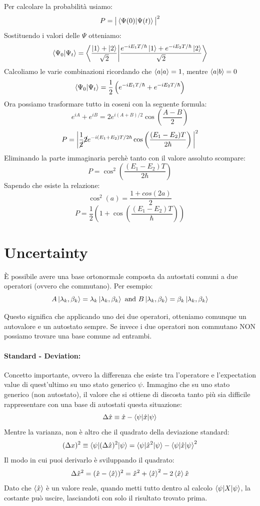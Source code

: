 \noindent Per calcolare la probabilità usiamo:
$$P = \big|\braket{\Psi(0)|\Psi(t)}\big|^2$$
Sostituendo i valori delle $\Psi$ otteniamo:
$$\braket{\Psi_0|\Psi_t} = \bigg\langle\frac{\ket{1} + \ket{2}}{\sqrt{2}}\bigg|\frac{e^{-iE_1T/\hbar}\ket{1} + e^{-iE_2T/\hbar}\ket{2}}{\sqrt{2}}\bigg\rangle$$
Calcoliamo le varie combinazioni ricordando che $\braket{a|a} = 1$, mentre $\braket{a|b} = 0$
$$\braket{\Psi_0|\Psi_t} = \frac{1}{2}\left( e^{-iE_1T/\hbar} + e^{-iE_2T/\hbar} \right)$$
Ora possiamo trasformare tutto in coseni con la seguente formula:
$$e^{iA} + e^{iB} = 2e^{i(A+B)/2} \cos\left(\frac{A-B}{2}\right)$$
$$P = \bigg|\frac{1}{\cancel{2}}\cancel{2}e^{-i(E_1+E_2)T/2\hbar}\cos\left( \frac{(E_1-E_2)T}{2\hbar}\right)\bigg|^2$$
Eliminando la parte immaginaria perchè tanto con il valore assoluto scompare:
$$P = \cos^2\left( \frac{(E_1-E_2)T}{2\hbar} \right)$$
Sapendo che esiste la relazione:
$$\cos^2(a) = \frac{1+cos(2a)}{2}$$
$$P = \frac{1}{2}\left(1 + \cos\left( \frac{(E_1 - E_2)T}{\hbar} \right)\right)$$

\section{Uncertainty}

È possibile avere una base ortonormale composta da autostati comuni a due operatori (ovvero che commutano). Per esempio:
$$A\ket{\lambda_k, \beta_k} = \lambda_k\ket{\lambda_k, \beta_k} \text{ and } B\ket{\lambda_k, \beta_k} = \beta_k\ket{\lambda_k, \beta_k}$$

\noindent Questo significa che applicando uno dei due operatori, otteniamo comunque un autovalore e un autostato sempre. Se invece i due operatori non commutano NON possiamo trovare una base comune ad entrambi.

\paragraph{Standard - Deviation:}
Concetto importante, ovvero la differenza che esiste tra l'operatore e l'expectation value di quest'ultimo su uno stato generico $\psi$. Immagino che su uno stato generico (non autostato), il valore che si ottiene di discosta tanto più sia difficile rappresentare con una base di autostati questa situazione:
$$\Delta\hat{x} \equiv \hat{x} - \braket{\psi|\hat{x}|\psi}$$
Mentre la varianza, non è altro che il quadrato della deviazione standard:
$$(\Delta x)^2 \equiv \braket{\psi|(\Delta \hat{x})^2|\psi} = \braket{\psi|\hat{x}^2|\psi} - \braket{\psi|\hat{x}|\psi}^2$$
Il modo in cui puoi derivarlo è sviluppando il quadrato:
$$\Delta \hat{x} ^ 2 = (\hat{x} - \braket{\hat{x}})^2 = \hat{x}^2 + \braket{\hat{x}}^2 - 2\braket{\hat{x}}\hat{x}$$
Dato che $\braket{\hat{x}}$ è un valore reale, quando metti tutto dentro al calcolo $\braket{\psi|X|\psi}$, la costante può uscire, lasciandoti con solo il risultato trovato prima.

